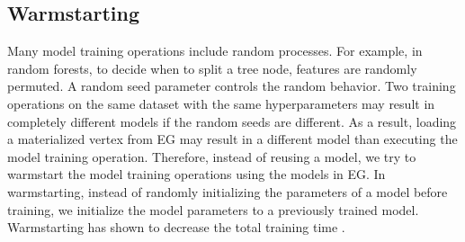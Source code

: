 \subsection{Warmstarting}
Many model training operations include random processes.
For example, in random forests, to decide when to split a tree node, features are randomly permuted.
A random seed parameter controls the random behavior.
Two training operations on the same dataset with the same hyperparameters may result in completely different models if the random seeds are different.
As a result, loading a materialized vertex from EG may result in a different model than executing the model training operation.
Therefore, instead of reusing a model, we try to warmstart the model training operations using the models in EG.
In warmstarting, instead of randomly initializing the parameters of a model before training, we initialize the model parameters to a previously trained model.
Warmstarting has shown to decrease the total training time \cite{baylor2017tfx}.

